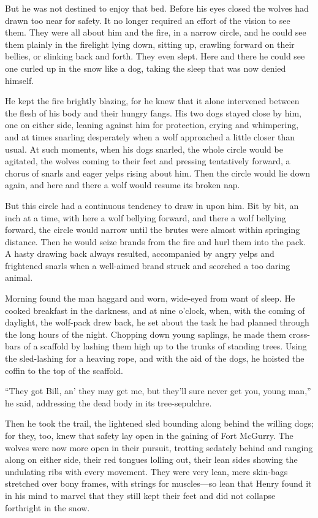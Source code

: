 \documentclass[10pt]{book}
\begin{document}
But he was not destined to enjoy that bed. Before his eyes closed the
wolves had drawn too near for safety. It no longer required an effort
of the vision to see them. They were all about him and the fire, in a
narrow circle, and he could see them plainly in the firelight lying
down, sitting up, crawling forward on their bellies, or slinking back
and forth. They even slept. Here and there he could see one curled up
in the snow like a dog, taking the sleep that was now denied himself.

He kept the fire brightly blazing, for he knew that it alone intervened
between the flesh of his body and their hungry fangs. His two dogs
stayed close by him, one on either side, leaning against him for
protection, crying and whimpering, and at times snarling desperately
when a wolf approached a little closer than usual. At such moments,
when his dogs snarled, the whole circle would be agitated, the wolves
coming to their feet and pressing tentatively forward, a chorus of
snarls and eager yelps rising about him. Then the circle would lie down
again, and here and there a wolf would resume its broken nap.

But this circle had a continuous tendency to draw in upon him. Bit by
bit, an inch at a time, with here a wolf bellying forward, and there a
wolf bellying forward, the circle would narrow until the brutes were
almost within springing distance. Then he would seize brands from the
fire and hurl them into the pack. A hasty drawing back always resulted,
accompanied by angry yelps and frightened snarls when a well-aimed
brand struck and scorched a too daring animal.

Morning found the man haggard and worn, wide-eyed from want of sleep.
He cooked breakfast in the darkness, and at nine o’clock, when, with
the coming of daylight, the wolf-pack drew back, he set about the task
he had planned through the long hours of the night. Chopping down young
saplings, he made them cross-bars of a scaffold by lashing them high up
to the trunks of standing trees. Using the sled-lashing for a heaving
rope, and with the aid of the dogs, he hoisted the coffin to the top of
the scaffold.

“They got Bill, an’ they may get me, but they’ll sure never get you,
young man,” he said, addressing the dead body in its tree-sepulchre.

Then he took the trail, the lightened sled bounding along behind the
willing dogs; for they, too, knew that safety lay open in the gaining
of Fort McGurry. The wolves were now more open in their pursuit,
trotting sedately behind and ranging along on either side, their red
tongues lolling out, their lean sides showing the undulating ribs with
every movement. They were very lean, mere skin-bags stretched over bony
frames, with strings for muscles—so lean that Henry found it in his
mind to marvel that they still kept their feet and did not collapse
forthright in the snow.
\end{document}

